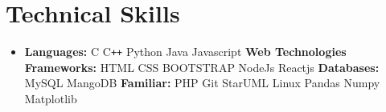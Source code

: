 \documentclass[letterpaper,5pt]{article}
\begin{document}
    \section{Technical Skills}
        \begin{itemize}[leftmargin=0.15in,label={}]
          \item{
            \textbf{Languages: }{C \textbullet{} C\texttt{++} \textbullet{} Python \textbullet{} Java \textbullet{} Javascript \newline}
            \textbf{Web Technologies Frameworks: }{HTML  \textbullet CSS \textbullet{} BOOTSTRAP \textbullet{} NodeJs \textbullet{} Reactjs \newline}
            \textbf{Databases: }{MySQL \textbullet{} MangoDB \newline}
            \textbf{Familiar: }{PHP \textbullet{} Git \textbullet{} StarUML \textbullet{} Linux \textbullet{} Pandas \textbullet{} Numpy \textbullet{} Matplotlib } 
            
          }
          
        \end{itemize}
        \vspace*{-6mm}  
    
\end{document}
